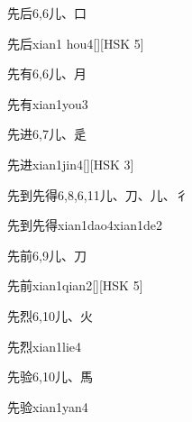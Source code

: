 \begin{entry}{先后}{6,6}{⼉、⼝}
  \begin{phonetics}{先后}{xian1 hou4}[][HSK 5]
  \end{phonetics}
\end{entry}

\begin{entry}{先有}{6,6}{⼉、⽉}
  \begin{phonetics}{先有}{xian1you3}
  \end{phonetics}
\end{entry}

\begin{entry}{先进}{6,7}{⼉、⾡}
  \begin{phonetics}{先进}{xian1jin4}[][HSK 3]
  \end{phonetics}
\end{entry}

\begin{entry}{先到先得}{6,8,6,11}{⼉、⼑、⼉、⼻}
  \begin{phonetics}{先到先得}{xian1dao4xian1de2}
  \end{phonetics}
\end{entry}

\begin{entry}{先前}{6,9}{⼉、⼑}
  \begin{phonetics}{先前}{xian1qian2}[][HSK 5]
  \end{phonetics}
\end{entry}

\begin{entry}{先烈}{6,10}{⼉、⽕}
  \begin{phonetics}{先烈}{xian1lie4}
  \end{phonetics}
\end{entry}

\begin{entry}{先验}{6,10}{⼉、⾺}
  \begin{phonetics}{先验}{xian1yan4}
  \end{phonetics}
\end{entry}

